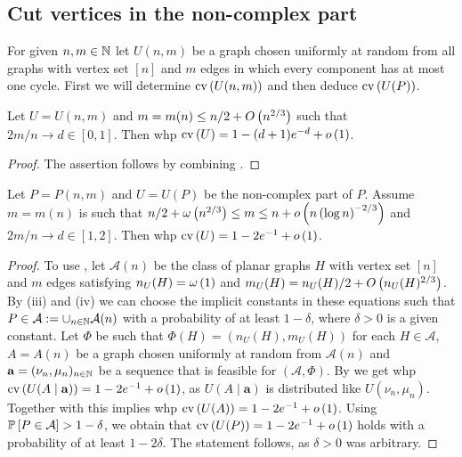 \subsection{Cut vertices in the non-complex part}\label{sub:non_complex}
 For given $n,m\in\mathbb{N}$ let $U(n,m)$ be a graph chosen uniformly at random from all graphs with vertex set $[n]$ and $m$ edges in which every component has at most one cycle. First we will determine $\operatorname{cv}\left(U(n,m)\right)$ and then deduce $\operatorname{cv}\left(U(P)\right)$.
\begin{lem}\label{lem:cv_non_complex}
Let $U=U(n,m)$ and $m=m(n)\leq n/2+O\left(n^{2/3}\right)$ such that $2m/n \to d\in[0,1]$. Then whp $\operatorname{cv}\left(U\right)=1-(d+1)e^{-d}+o\left(1\right)$.	
\end{lem}
\begin{proof}
The assertion follows by combining . 
\end{proof}
\begin{lem}\label{lem:cv_non_complex1}
Let $P=P(n,m)$ and $U=U(P)$ be the non-complex part of $P$. Assume $m=m(n)$ is such that $n/2+\omega\left(n^{2/3}\right)\leq m \leq n+o\left(n\left(\log n\right)^{-2/3}\right)$ and $2m/n \to d\in[1,2]$. Then whp $\operatorname{cv}\left(U\right)=1-2e^{-1}+o\left(1\right)$.
\end{lem}
\begin{proof}
To use , let $\mathcal{A}(n)$ be the class of planar graphs $H$ with vertex set $[n]$ and $m$ edges satisfying $n_U(H)=\omega\left(1\right)$ and $m_U(H)=n_U(H)/2+O\left(n_U(H)^{2/3}\right)$. By (iii) and (iv) we can choose the implicit constants in these equations such that $P\in\mathcal{A}:=\cup_{n\in\mathbb{N}}\mathcal{A}(n)$ with a probability of at least $1-\delta$, where $\delta>0$ is a given constant. Let $\Phi$ be such that $\Phi(H)=\left(n_U(H), m_U(H)\right)$ for each $H\in\mathcal{A}$, $A=A(n)$ be a graph chosen uniformly at random from $\mathcal{A}(n)$ and $\mathbf{a}=(\nu_n, \mu_n)_{n\in\mathbb{N}}$ be a sequence that is feasible for $\left(\mathcal{A},\Phi\right)$. By  we get whp $\operatorname{cv}\left(U(A \mid \mathbf{a})\right)=1-2e^{-1}+o\left(1\right)$, as $U(A \mid \mathbf{a})$ is distributed like $U(\nu_n, \mu_n)$. Together with  this implies whp $\operatorname{cv}\left(U(A)\right)=1-2e^{-1}+o\left(1\right)$. Using $\mathbb{P}\left[P\in\mathcal{A}\right]>1-\delta$, we obtain that $\operatorname{cv}\left(U(P)\right)=1-2e^{-1}+o\left(1\right)$ holds with a probability of at least $1-2\delta$. The statement follows, as $\delta>0$ was arbitrary.
\end{proof}
	
